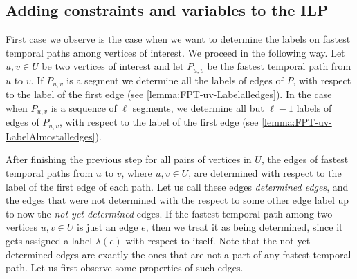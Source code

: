 \documentclass[11pt,a4paper]{article}
\theoremstyle{remark}
\theoremstyle{definition}
\begin{document}
\subsection{Adding constraints and variables to the ILP}
First case we observe is the case when we want to determine the labels on fastest temporal paths among vertices of interest.
We proceed in the following way.
Let $u,v \in U$ be two vertices of interest and let $P_{u,v}$ be the fastest temporal path from $u$ to $v$.
If $P_{u,v}$ is a segment we determine all the labels of edges of $P$, with respect to the label of the first edge (see \cref{lemma:FPT-uv-Labelalledges}).
In the case when $P_{u,v}$ is a sequence of $\ell$ segments, we determine all but $\ell - 1$ labels of edges of $P_{u,v}$, with respect to the label of the first edge (see \cref{lemma:FPT-uv-LabelAlmostalledges}). 

After finishing the previous step for all pairs of vertices in $U$,
the edges of fastest temporal paths from $u$ to $v$, where $u,v \in U$, are determined with respect to the label of the first edge of each path.
Let us call these edges \emph{determined edges}, and the edges that were not determined with the respect to some other edge label up to now the \emph{not yet determined} edges.
If the fastest temporal path among two vertices $u,v \in U$ is just an edge $e$, then we treat it as being determined, since it gets assigned a label $\lambda(e)$ with respect to itself.
Note that the not yet determined edges are exactly the ones that are not a part of any fastest temporal path.
Let us first observe some properties of such edges.
\end{document}
